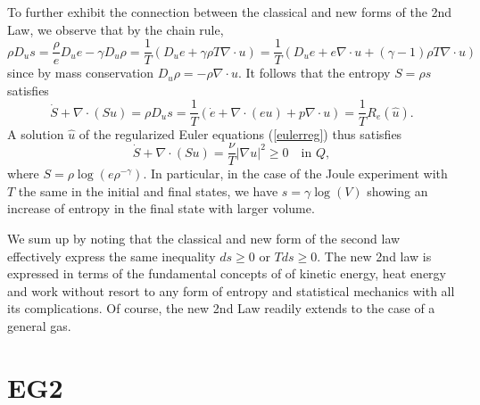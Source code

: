 To further exhibit the connection between the classical and
new forms of the 2nd Law, we observe that by the chain rule,
\[
\rho D_us=\frac{\rho}{e}D_ue-\gamma D_u\rho=
\frac{1}{T}(D_ue+\gamma \rho T\nabla\cdot u )=
\frac{1}{T}(D_ue+e\nabla\cdot u +(\gamma -1)\rho T\nabla\cdot u)
\]
since by mass conservation $D_u\rho =-\rho\nabla\cdot u$.
It follows that the entropy $S=\rho s$ satisfies 
\begin{equation}
\dot S+\nabla\cdot (Su)=\rho D_us=
\frac{1}{T}(\dot e+\nabla\cdot (eu)+p\nabla\cdot u)
=\frac{1}{T}R_e(\hat u).
\end{equation}
A solution $\hat u$ of the regularized Euler equations (\ref{eulerreg})
thus satisfies 
\begin{equation}\label{2ndlawS}
\dot S+\nabla\cdot (Su)=
\frac{\nu}{T}\vert\nabla u\vert^2\ge 0 \quad\mbox{in }Q,
\end{equation}
where $S=\rho\log(e\rho^{-\gamma})$. In particular, 
in the case of the Joule experiment with $T$ the same
in the initial and final states, we have $s=\gamma\log(V)$ showing
an increase of entropy in the final state with larger volume.   

We sum up by noting that the classical and new form of the second
law effectively express the same inequality $ds\ge 0$ or $Tds\ge 0$.
The new 2nd law is expressed in terms of the fundamental concepts of
of kinetic energy, heat energy and work without resort to any 
form of entropy and  statistical mechanics with all its 
complications. Of course, the new 2nd Law readily extends to
the case of a general gas.




\section{EG2}

